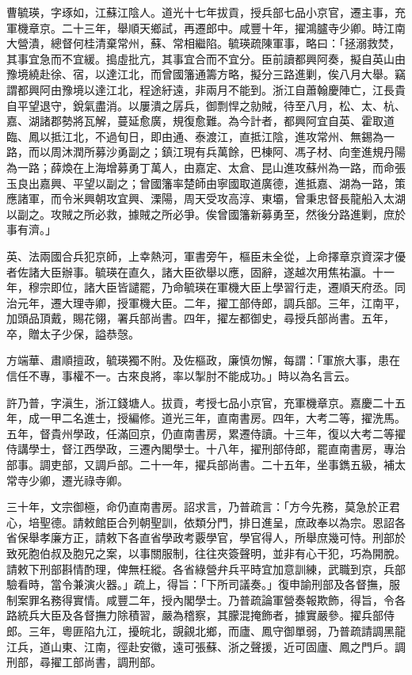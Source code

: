 \begin{pinyinscope}
曹毓瑛，字琢如，江蘇江陰人。道光十七年拔貢，授兵部七品小京官，遷主事，充軍機章京。二十三年，舉順天鄉試，再遷郎中。咸豐十年，擢鴻臚寺少卿。時江南大營潰，總督何桂清棄常州，蘇、常相繼陷。毓瑛疏陳軍事，略曰：「拯溺救焚，其事宜急而不宜緩。搗虛批亢，其事宜合而不宜分。臣前讀都興阿奏，擬自英山由豫境繞赴徐、宿，以達江北，而曾國籓通籌方略，擬分三路進剿，俟八月大舉。竊謂都興阿由豫境以達江北，程途紆遠，非兩月不能到。浙江自蕭翰慶陣亡，江長貴自平望退守，銳氣盡消。以屢潰之孱兵，御剽悍之勍賊，待至八月，松、太、杭、嘉、湖諸郡勢將瓦解，蔓延愈廣，規復愈難。為今計者，都興阿宜自英、霍取道臨、鳳以抵江北，不過旬日，即由通、泰渡江，直抵江陰，進攻常州、無錫為一路，而以周沐潤所募沙勇副之；鎮江現有兵萬餘，巴棟阿、馮子材、向奎進規丹陽為一路；薛煥在上海增募勇丁萬人，由嘉定、太倉、昆山進攻蘇州為一路，而命張玉良出嘉興、平望以副之；曾國籓率楚師由寧國取道廣德，進抵嘉、湖為一路，策應諸軍，而令米興朝攻宜興、溧陽，周天受攻高淳、東壩，曾秉忠督長龍船入太湖以副之。攻賊之所必救，據賊之所必爭。俟曾國籓新募勇至，然後分路進剿，庶於事有濟。」

英、法兩國合兵犯京師，上幸熱河，軍書旁午，樞臣未全從，上命擇章京資深才優者佐諸大臣辦事。毓瑛在直久，諸大臣欲舉以應，固辭，遂越次用焦祐瀛。十一年，穆宗即位，諸大臣皆譴罷，乃命毓瑛在軍機大臣上學習行走，遷順天府丞。同治元年，遷大理寺卿，授軍機大臣。二年，擢工部侍郎，調兵部。三年，江南平，加頭品頂戴，賜花翎，署兵部尚書。四年，擢左都御史，尋授兵部尚書。五年，卒，贈太子少保，謚恭愨。

方端華、肅順擅政，毓瑛獨不附。及佐樞政，廉慎勿懈，每謂：「軍旅大事，患在信任不專，事權不一。古來良將，率以掣肘不能成功。」時以為名言云。

許乃普，字滇生，浙江錢塘人。拔貢，考授七品小京官，充軍機章京。嘉慶二十五年，成一甲二名進士，授編修。道光三年，直南書房。四年，大考二等，擢洗馬。五年，督貴州學政，任滿回京，仍直南書房，累遷侍讀。十三年，復以大考二等擢侍講學士，督江西學政，三遷內閣學士。十八年，擢刑部侍郎，罷直南書房，專治部事。調吏部，又調戶部。二十一年，擢兵部尚書。二十五年，坐事鐫五級，補太常寺少卿，遷光祿寺卿。

三十年，文宗御極，命仍直南書房。詔求言，乃普疏言：「方今先務，莫急於正君心，培聖德。請敕館臣合列朝聖訓，依類分門，排日進呈，庶政奉以為宗。恩詔各省保舉孝廉方正，請敕下各直省學政考覈學官，學官得人，所舉庶幾可恃。刑部於致死胞伯叔及胞兄之案，以事關服制，往往夾簽聲明，並非有心干犯，巧為開脫。請敕下刑部斟情酌理，俾無枉縱。各省綠營弁兵平時宜加意訓練，武職到京，兵部驗看時，當令兼演火器。」疏上，得旨：「下所司議奏。」復申諭刑部及各督撫，服制案罪名務得實情。咸豐二年，授內閣學士。乃普疏論軍營奏報欺飾，得旨，令各路統兵大臣及各督撫力除積習，嚴為稽察，其朦混掩飾者，據實嚴參。擢兵部侍郎。三年，粵匪陷九江，擾皖北，覬覦北鄉，而廬、鳳守御單弱，乃普疏請調黑龍江兵，道山東、江南，徑赴安徽，遠可張蘇、浙之聲援，近可固廬、鳳之門戶。調刑部，尋擢工部尚書，調刑部。


\end{pinyinscope}
